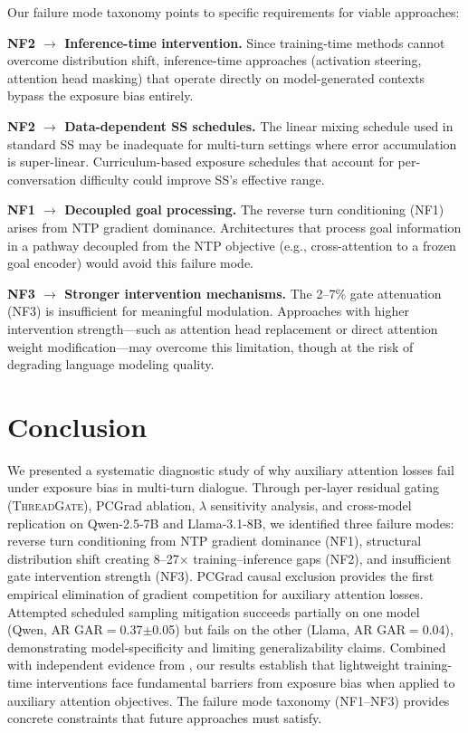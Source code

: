 \documentclass[11pt]{article}
\newcommand{\gar}{\textsc{GAR}}
\newcommand{\tg}{\textsc{ThreadGate}}
\begin{document}
Our failure mode taxonomy points to specific requirements for viable approaches:

\textbf{NF2 $\to$ Inference-time intervention.} Since training-time methods cannot overcome distribution shift, inference-time approaches (activation steering, attention head masking) that operate directly on model-generated contexts bypass the exposure bias entirely.

\textbf{NF2 $\to$ Data-dependent SS schedules.} The linear mixing schedule used in standard SS may be inadequate for multi-turn settings where error accumulation is super-linear. Curriculum-based exposure schedules that account for per-conversation difficulty could improve SS's effective range.

\textbf{NF1 $\to$ Decoupled goal processing.} The reverse turn conditioning (NF1) arises from NTP gradient dominance. Architectures that process goal information in a pathway decoupled from the NTP objective (e.g., cross-attention to a frozen goal encoder) would avoid this failure mode.

\textbf{NF3 $\to$ Stronger intervention mechanisms.} The 2--7\% gate attenuation (NF3) is insufficient for meaningful modulation. Approaches with higher intervention strength---such as attention head replacement or direct attention weight modification---may overcome this limitation, though at the risk of degrading language modeling quality.

\section{Conclusion}

We presented a systematic diagnostic study of why auxiliary attention losses fail under exposure bias in multi-turn dialogue. Through per-layer residual gating (\tg{}), PCGrad ablation, $\lambda$ sensitivity analysis, and cross-model replication on Qwen-2.5-7B and Llama-3.1-8B, we identified three failure modes: reverse turn conditioning from NTP gradient dominance (NF1), structural distribution shift creating 8--27$\times$ training--inference gaps (NF2), and insufficient gate intervention strength (NF3). PCGrad causal exclusion provides the first empirical elimination of gradient competition for auxiliary attention losses. Attempted scheduled sampling mitigation succeeds partially on one model (Qwen, AR \gar{}$=$0.37$\pm$0.05) but fails on the other (Llama, AR \gar{}$=$0.04), demonstrating model-specificity and limiting generalizability claims. Combined with independent evidence from \citet{dongre2026goal}, our results establish that lightweight training-time interventions face fundamental barriers from exposure bias when applied to auxiliary attention objectives. The failure mode taxonomy (NF1--NF3) provides concrete constraints that future approaches must satisfy.
\end{document}
